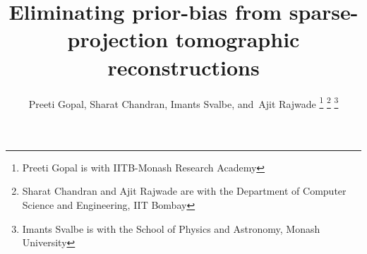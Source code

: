 \documentclass[journal]{IEEEtran}
\begin{document}
%
\title{Eliminating prior-bias from sparse-projection tomographic reconstructions}
%
%
%

\author{Preeti Gopal,
  Sharat Chandran,
  Imants Svalbe,
        and~Ajit Rajwade
\thanks{Preeti Gopal is with IITB-Monash Research Academy}
\thanks{Sharat Chandran and Ajit Rajwade are with the Department of Computer Science and Engineering, IIT Bombay}
\thanks{Imants Svalbe is with the School of Physics and Astronomy, Monash University}}



\maketitle
\end{document}
